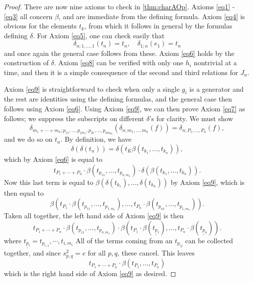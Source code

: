\begin{proof}
There are now nine axioms to check in \cref{thm:charAOp}. Axioms \ref{eq1} - \ref{eq3} all concern $\beta$, and are immediate from the defining formula. Axiom \ref{eq4} is obvious for the elements $t_{k}$, from which it follows in general by the formulas defining $\delta$. For Axiom \ref{eq5}, one can check easily that
  \[
    \delta_{n; 1, \ldots, 1}(t_{n}) = t_{n}, \quad \delta_{1;n}(e_1) = t_{n}
  \]
and once again the general case follows from these. Axiom \ref{eq6} holds by the construction of $\delta$. Axiom \ref{eq8} can be verified with only one $h_{i}$ nontrivial at a time, and then it is a simple consequence of the second and third relations for $J_{n}$.

Axiom \ref{eq9} is straightforward to check when only a single $g_{i}$ is a generator and the rest are identities using the defining formulas, and the general case then follows using Axiom \ref{eq6}. Using Axiom \ref{eq9}, we can then prove Axiom \ref{eq7} as follows; we suppress the subscripts on different $\delta$'s for clarity. We must show
  \[
    \delta_{m_1 + \cdots + m_n; p_{11}, \ldots, p_{1m_{1}}, p_{21}, \ldots, p_{nm_{m}}}\left( \delta_{n; m_{1}, \ldots, m_{n}}(f) \right) = \delta_{n; P_{1}, \ldots, P_{n}}(f),
  \]
and we do so on $t_{n}$. By definition, we have
  \[
    \delta \left( \delta(t_{n}) \right) = \delta \left( t_{K} \beta(t_{k_{1}}, \ldots, t_{k_{n}}) \right),
  \]
which by Axiom \ref{eq6} is equal to
  \[
    t_{P_{1} + \cdots + P_{n}} \cdot \beta(t_{p_{11}}, \ldots, t_{p_{n,m_{n}}}) \cdot \delta\left( \beta(t_{k_{1}}, \ldots, t_{k_{n}}) \right).
  \]
Now this last term is equal to $\beta \left( \delta(t_{k_{1}}), \ldots, \delta(t_{k_{n}}) \right)$ by Axiom \ref{eq9}, which is then equal to
  \[
    \beta \left( t_{P_{1}}\cdot \beta(t_{p_{11}}, \ldots, t_{p_{1,m_{1}}}), \ldots,  t_{P_{n}}\cdot \beta(t_{p_{n1}}, \ldots, t_{p_{1,m_{n}}}) \right).
  \]
Taken all together, the left hand side of Axiom \ref{eq9} is then
  \[
    t_{P_{1} + \cdots + P_{n}} \cdot \beta(t_{p_{11}}, \ldots, t_{p_{n,m_{n}}}) \cdot \beta \left( t_{P_{1}}\cdot \beta(\underline{t_{p_{1}}}), \ldots,  t_{P_{n}}\cdot \beta(\underline{t_{p_{n}}}) \right).
  \]
where $\underline{t_{p_{i}}} = t_{p_{i,1}}, \cdots, t_{i,m_{i}}$
All of the terms coming from an $t_{p_{ij}}$ can be collected together, and since $s_{p,q}^{2} = e$ for all $p,q$, these cancel. This leaves
  \[
    t_{P_{1} + \cdots + P_{n}} \cdot \beta \left( t_{P_{1}}, \ldots,  t_{P_{n}} \right)
  \]
which is the right hand side of Axiom \ref{eq9} as desired.
\end{proof}

